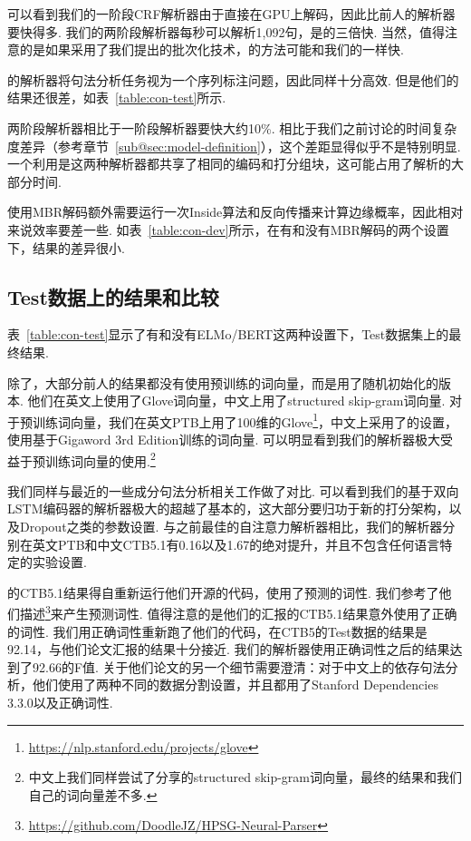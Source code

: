 可以看到我们的一阶段CRF解析器由于直接在GPU上解码，因此比前人的解析器要快得多.
我们的两阶段解析器每秒可以解析1,092句，是\cite{kitaev-klein-2018-constituency}的三倍快.
当然，值得注意的是如果采用了我们提出的批次化技术，\cite{stern-etal-2017-minimal,kitaev-klein-2018-constituency}的方法可能和我们的一样快.

\cite{gomez-rodriguez-vilares-2018-constituent}的解析器将句法分析任务视为一个序列标注问题，因此同样十分高效.
但是他们的结果还很差，如表~\ref{table:con-test}所示.

两阶段解析器相比于一阶段解析器要快大约10\%.
相比于我们之前讨论的时间复杂度差异（参考章节~\ref{sub@sec:model-definition}），这个差距显得似乎不是特别明显.
一个利用是这两种解析器都共享了相同的编码和打分组块，这可能占用了解析的大部分时间.

使用MBR解码额外需要运行一次Inside算法和反向传播来计算边缘概率，因此相对来说效率要差一些.
如表~\ref{table:con-dev}所示，在有和没有MBR解码的两个设置下，结果的差异很小.

\subsection{Test数据上的结果和比较}
表~\ref{table:con-test}显示了有和没有ELMo/BERT这两种设置下，Test数据集上的最终结果.

除了\cite{zhou-zhao-2019-head}，大部分前人的结果都没有使用预训练的词向量，而是用了随机初始化的版本.
他们在英文上使用了Glove词向量，中文上用了structured skip-gram词向量.
对于预训练词向量，我们在英文PTB上用了100维的Glove\footnote{\url{https://nlp.stanford.edu/projects/glove}}，中文上采用了\cite{li-etal-2019-attentive}的设置，使用基于Gigaword 3rd Edition训练的词向量.
可以明显看到我们的解析器极大受益于预训练词向量的使用.\footnote{
    中文上我们同样尝试了\cite{zhou-zhao-2019-head}分享的structured skip-gram词向量，最终的结果和我们自己的词向量差不多.
}

我们同样与最近的一些成分句法分析相关工作做了对比.
可以看到我们的基于双向LSTM编码器的解析器极大的超越了基本的\cite{stern-etal-2017-minimal}，这大部分要归功于新的打分架构，以及Dropout之类的参数设置.
与之前最佳的自注意力解析器相比\cite{kitaev-klein-2018-constituency}，我们的解析器分别在英文PTB和中文CTB5.1有0.16以及1.67的绝对提升，并且不包含任何语言特定的实验设置.

\cite{zhou-zhao-2019-head}的CTB5.1结果得自重新运行他们开源的代码，使用了预测的词性.
我们参考了他们描述\footnote{\url{https://github.com/DoodleJZ/HPSG-Neural-Parser}}来产生预测词性.
值得注意的是他们的汇报的CTB5.1结果意外使用了正确的词性.
我们用正确词性重新跑了他们的代码，在CTB5的Test数据的结果是92.14，与他们论文汇报的结果十分接近.
我们的解析器使用正确词性之后的结果达到了92.66的F值.
关于他们论文的另一个细节需要澄清：对于中文上的依存句法分析，他们使用了两种不同的数据分割设置，并且都用了Stanford Dependencies 3.3.0以及正确词性.

